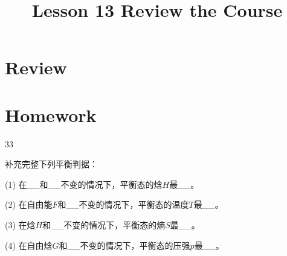 \documentclass[CJK]{beamer}
\title{Lesson 13 Review the Course }
\author{}
\date{}
\begin{document}

\section{Review}




\section{Homework}

\begin{frame}
  \bch
  {\small
  \bitem
\item[33]{补充完整下列平衡判据：
  \bitem
\item[(1)]{在\_\_和\_\_不变的情况下，平衡态的焓$H$最\_\_。}
\item[(2)]{在自由能$F$和\_\_不变的情况下，平衡态的温度$T$最\_\_。}
\item[(3)]{在焓$H$和\_\_不变的情况下，平衡态的熵$S$最\_\_。}
\item[(4)]{在自由焓$G$和\_\_不变的情况下，平衡态的压强$p$最\_\_。}
  \eitem}
  \eitem
  }
  \ech
\end{frame}
\end{document}
